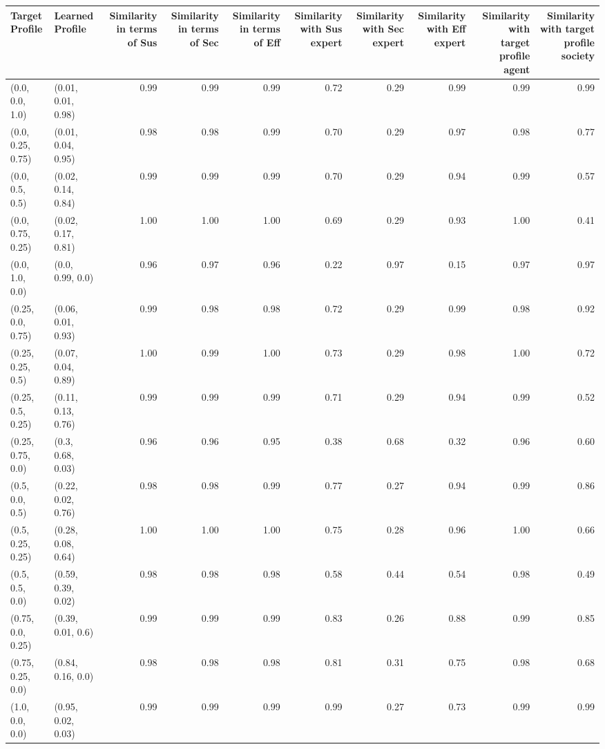 \begin{tabular}{llrrrrrrrr}
\toprule
Target Profile & Learned Profile & Similarity in terms of Sus & Similarity in terms of Sec & Similarity in terms of Eff & Similarity with Sus expert & Similarity with Sec expert & Similarity with Eff expert & Similarity with target profile agent & Similarity with target profile society \\
\midrule
(0.0, 0.0, 1.0) & (0.01, 0.01, 0.98) & 0.99 & 0.99 & 0.99 & 0.72 & 0.29 & 0.99 & 0.99 & 0.99 \\
(0.0, 0.25, 0.75) & (0.01, 0.04, 0.95) & 0.98 & 0.98 & 0.99 & 0.70 & 0.29 & 0.97 & 0.98 & 0.77 \\
(0.0, 0.5, 0.5) & (0.02, 0.14, 0.84) & 0.99 & 0.99 & 0.99 & 0.70 & 0.29 & 0.94 & 0.99 & 0.57 \\
(0.0, 0.75, 0.25) & (0.02, 0.17, 0.81) & 1.00 & 1.00 & 1.00 & 0.69 & 0.29 & 0.93 & 1.00 & 0.41 \\
(0.0, 1.0, 0.0) & (0.0, 0.99, 0.0) & 0.96 & 0.97 & 0.96 & 0.22 & 0.97 & 0.15 & 0.97 & 0.97 \\
(0.25, 0.0, 0.75) & (0.06, 0.01, 0.93) & 0.99 & 0.98 & 0.98 & 0.72 & 0.29 & 0.99 & 0.98 & 0.92 \\
(0.25, 0.25, 0.5) & (0.07, 0.04, 0.89) & 1.00 & 0.99 & 1.00 & 0.73 & 0.29 & 0.98 & 1.00 & 0.72 \\
(0.25, 0.5, 0.25) & (0.11, 0.13, 0.76) & 0.99 & 0.99 & 0.99 & 0.71 & 0.29 & 0.94 & 0.99 & 0.52 \\
(0.25, 0.75, 0.0) & (0.3, 0.68, 0.03) & 0.96 & 0.96 & 0.95 & 0.38 & 0.68 & 0.32 & 0.96 & 0.60 \\
(0.5, 0.0, 0.5) & (0.22, 0.02, 0.76) & 0.98 & 0.98 & 0.99 & 0.77 & 0.27 & 0.94 & 0.99 & 0.86 \\
(0.5, 0.25, 0.25) & (0.28, 0.08, 0.64) & 1.00 & 1.00 & 1.00 & 0.75 & 0.28 & 0.96 & 1.00 & 0.66 \\
(0.5, 0.5, 0.0) & (0.59, 0.39, 0.02) & 0.98 & 0.98 & 0.98 & 0.58 & 0.44 & 0.54 & 0.98 & 0.49 \\
(0.75, 0.0, 0.25) & (0.39, 0.01, 0.6) & 0.99 & 0.99 & 0.99 & 0.83 & 0.26 & 0.88 & 0.99 & 0.85 \\
(0.75, 0.25, 0.0) & (0.84, 0.16, 0.0) & 0.98 & 0.98 & 0.98 & 0.81 & 0.31 & 0.75 & 0.98 & 0.68 \\
(1.0, 0.0, 0.0) & (0.95, 0.02, 0.03) & 0.99 & 0.99 & 0.99 & 0.99 & 0.27 & 0.73 & 0.99 & 0.99 \\
\bottomrule
\end{tabular}
